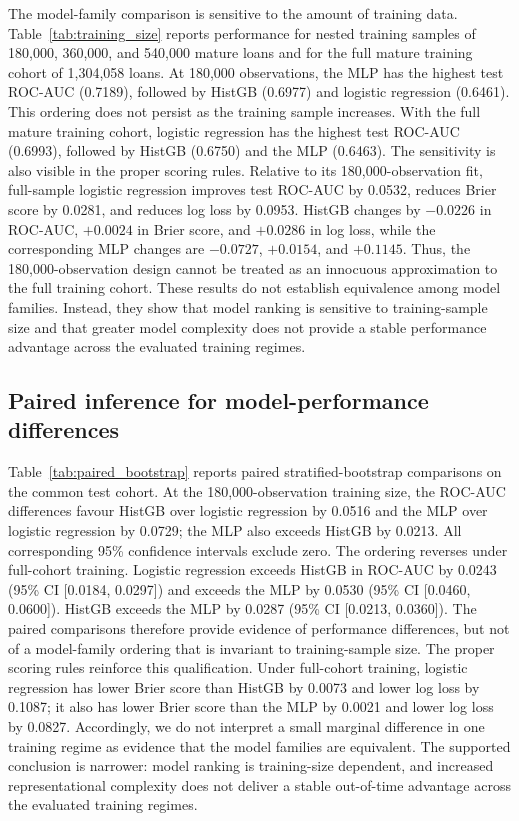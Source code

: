 \documentclass[10pt]{article}
\begin{document}
The model-family comparison is sensitive to the amount of training data. Table~\ref{tab:training_size} reports performance for nested training samples of 180,000, 360,000, and 540,000 mature loans and for the full mature training cohort of 1,304,058 loans. At 180,000 observations, the MLP has the highest test ROC-AUC (0.7189), followed by HistGB (0.6977) and logistic regression (0.6461). This ordering does not persist as the training sample increases. With the full mature training cohort, logistic regression has the highest test ROC-AUC (0.6993), followed by HistGB (0.6750) and the MLP (0.6463). The sensitivity is also visible in the proper scoring rules. Relative to its 180,000-observation fit, full-sample logistic regression improves test ROC-AUC by 0.0532, reduces Brier score by 0.0281, and reduces log loss by 0.0953. HistGB changes by $-0.0226$ in ROC-AUC, $+0.0024$ in Brier score, and $+0.0286$ in log loss, while the corresponding MLP changes are $-0.0727$, $+0.0154$, and $+0.1145$. Thus, the 180,000-observation design cannot be treated as an innocuous approximation to the full training cohort. These results do not establish equivalence among model families. Instead, they show that model ranking is sensitive to training-sample size and that greater model complexity does not provide a stable performance advantage across the evaluated training regimes.



\subsection{Paired inference for model-performance differences}
\label{sec:pairedinference}

Table~\ref{tab:paired_bootstrap} reports paired stratified-bootstrap comparisons on the common test cohort. At the 180,000-observation training size, the ROC-AUC differences favour HistGB over logistic regression by 0.0516 and the MLP over logistic regression by 0.0729; the MLP also exceeds HistGB by 0.0213. All corresponding 95\% confidence intervals exclude zero. The ordering reverses under full-cohort training. Logistic regression exceeds HistGB in ROC-AUC by 0.0243 (95\% CI [0.0184, 0.0297]) and exceeds the MLP by 0.0530 (95\% CI [0.0460, 0.0600]). HistGB exceeds the MLP by 0.0287 (95\% CI [0.0213, 0.0360]). The paired comparisons therefore provide evidence of performance differences, but not of a model-family ordering that is invariant to training-sample size. The proper scoring rules reinforce this qualification. Under full-cohort training, logistic regression has lower Brier score than HistGB by 0.0073 and lower log loss by 0.1087; it also has lower Brier score than the MLP by 0.0021 and lower log loss by 0.0827. Accordingly, we do not interpret a small marginal difference in one training regime as evidence that the model families are equivalent. The supported conclusion is narrower: model ranking is training-size dependent, and increased representational complexity does not deliver a stable out-of-time advantage across the evaluated training regimes.
\end{document}
